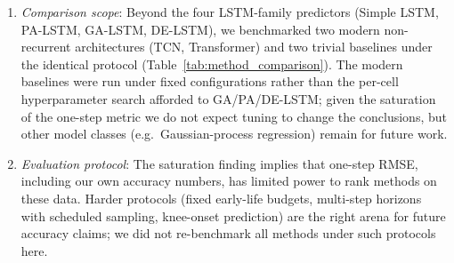 \begin{enumerate}
  \item \textit{Comparison scope}: Beyond the four LSTM-family predictors
        (Simple LSTM, PA-LSTM, GA-LSTM, DE-LSTM), we benchmarked two modern
        non-recurrent architectures (TCN, Transformer) and two trivial
        baselines under the identical protocol
        (Table~\ref{tab:method_comparison}).
        The modern baselines were run under fixed configurations rather than
        the per-cell hyperparameter search afforded to GA/PA/DE-LSTM; given
        the saturation of the one-step metric we do not expect tuning to
        change the conclusions, but other model classes (e.g.\
        Gaussian-process regression) remain for future work.

  \item \textit{Evaluation protocol}: The saturation finding implies that
        one-step RMSE, including our own accuracy numbers, has limited power
        to rank methods on these data.
        Harder protocols (fixed early-life budgets, multi-step horizons with
        scheduled sampling, knee-onset prediction) are the right arena for
        future accuracy claims; we did not re-benchmark all methods under
        such protocols here.
\end{enumerate}
